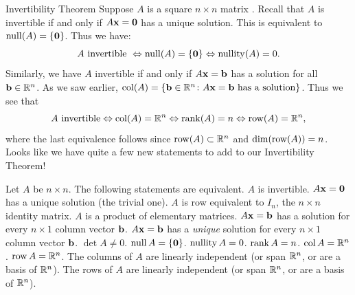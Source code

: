 \begin{frame}{Invertibility Theorem}
\alert{Suppose $A$ is a square $n\times n$ matrix} . Recall that $A$ is invertible if and only if $A{\mathbf x}={\mathbf 0}$ has a unique solution. This is equivalent to $\operatorname{null}(A)=\{{\mathbf 0}\}$. Thus we have: 
\[
A \text{ invertible } \Leftrightarrow \operatorname{null}(A)=\{{\mathbf 0}\}\Leftrightarrow \operatorname{nullity}(A)=0.
\]
\pause Similarly, we have $A$ invertible if and only if $A{\mathbf x}={\mathbf b}$ has a solution \alert{for all} ${\mathbf b}\in{\mathbb R}^n$. As we saw earlier, $\operatorname{col}(A)=\{{\mathbf b}\in{\mathbb R}^n\colon A{\mathbf x}={\mathbf b} \text{ has a solution}\}$. Thus we see that 
\[
A \text{ invertible}\Leftrightarrow \operatorname{col}(A)={\mathbb R}^n \Leftrightarrow \operatorname{rank}(A)=n \Leftrightarrow \operatorname{row}(A)={\mathbb R}^n,
\]
where the last equivalence follows since $\operatorname{row}(A)\subset{\mathbb R}^n$ and $\dim(\operatorname{row}(A))=n$. 
\bpause 
Looks like we have quite a few new statements to add to our Invertibility Theorem! 
\end{frame}
\begin{frame}
\begin{theorem}
Let $A$ be $n\times n$. The following statements are equivalent. 
\bb[(a)]
\ii $A$ is invertible.
\ii $A{\mathbf x}={\mathbf 0}$ has a unique solution (the trivial one). 
\ii $A$ is row equivalent to $I_n$, the $n\times n$ identity matrix.
\ii $A$ is a product of elementary matrices. 	
\ii $A{\mathbf x}={\mathbf b}$ has a solution for every $n\times 1$ column vector ${\mathbf b}$. 
\ii $A{\mathbf x}={\mathbf b}$ has a {\em unique} solution for every $n\times 1$ column vector ${\mathbf b}$. 
\ii $\det A\ne 0$.
\ii $\operatorname{null} A=\{{\mathbf 0}\}$.
\ii $\operatorname{nullity} A=0$.
\ii $\operatorname{rank} A=n$. 
\ii $\operatorname{col} A={\mathbb R}^n$.
\ii $\operatorname{row} A={\mathbb R}^n$.
\ii The columns of $A$ are linearly independent (or span ${\mathbb R}^n$, or are a basis of ${\mathbb R}^n$).
\ii The rows of $A$ are linearly independent (or span ${\mathbb R}^n$, or are a basis of ${\mathbb R}^n$). 
\ee
\end{theorem}

\end{frame}






